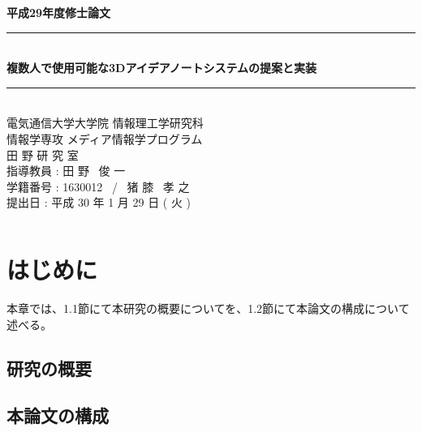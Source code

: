\documentclass[11pt,a4j, titlepage]{jarticle} %
\begin{document}
\begin{titlepage}
	\begin{center}
		\vspace{8ex}
		{\Large \bf 平成29年度修士論文}
		\vspace{3ex}\\
		\rule{\hsize}{2mm}
		\vspace{1mm}\\ 
		{\LARGE \bf 複数人で使用可能な3Dアイデアノートシステムの提案と実装} 
		\vspace{6mm}\\ 
		\rule{\hsize}{2mm} 
		\vspace{2.5cm} \\ 
		{\Large 電気通信大学大学院 情報理工学研究科 \\ 
		情報学専攻 メディア情報学プログラム} 
		\vspace{2ex} \\ 
		\renewcommand{\thefootnote}{\fnsymbol{footnote}} 
		{\Large 田 野 研 究 室} 
		\vspace{3ex} \\ 
		{\Large 指導教員 : 田 野 \ 俊 一} 
		\vspace{3ex} \\
		{\Large 学籍番号 : 1630012 \ / \ 猪 膝 \ 孝 之} 
		\vspace{5ex} \\ 
		{\Large 提出日 : 平成 30 年 1 月 29 日 ( 火 )} 
		\vspace{-5ex} \\ 
		\begin{verbatim} 
		\end{verbatim} 
	\end{center} 
\end{titlepage}

\tableofcontents
\newpage
\listoffigures
\newpage
\listoftables
\newpage
\section{はじめに}
本章では、1.1節にて本研究の概要についてを、1.2節にて本論文の構成について述べる。

\subsection{研究の概要}


\subsection{本論文の構成}
\end{document}
